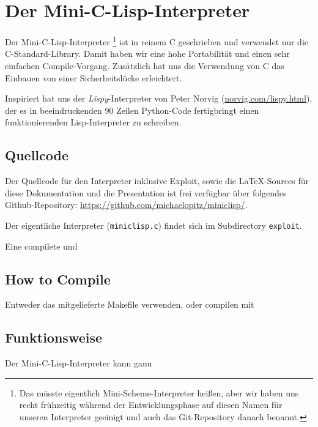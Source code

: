 \section[Mini-C-Lisp]{Der Mini-C-Lisp-Interpreter}
Der Mini-C-Lisp-Interpreter  \footnote{Das müsste eigentlich Mini-Scheme-Interpreter heißen, aber wir
  haben uns recht frühzeitig während der Entwicklungsphase auf diesen Namen
  für unseren Interpreter geeinigt und auch das Git-Repository danach benannt.
} ist in reinem C geschrieben und verwendet nur die
C-Standard-Library. Damit haben wir eine hohe Portabilität und einen sehr
einfachen Compile-Vorgang. Zusätzlich hat uns die Verwendung von C das Einbauen
von einer Sicherheitslücke erleichtert.
\par
Inspiriert hat uns der \emph{Lispy}-Interpreter von Peter Norvig
(\url{norvig.com/lispy.html}), der es in beeindruckenden 90 Zeilen Python-Code
fertigbringt einen funktionierenden Lisp-Interpreter zu schreiben.

\subsection[Quellcode]{Quellcode}
Der Quellcode für den Interpreter inklusive Exploit, sowie die \LaTeX-Sources
für diese Dokumentation und die Presentation ist frei verfügbar 
über folgendes Github-Repository: 
\url{https://github.com/michaelopitz/miniclisp/}.
\par
Der eigentliche Interpreter (\texttt{miniclisp.c}) findet sich im Subdirectory
\texttt{exploit}.
\par
Eine compilete und


\subsection[Compiling]{How to Compile}
Entweder das mitgelieferte Makefile verwenden, oder compilen mit


\subsection[Funktionsweise]{Funktionsweise}
Der Mini-C-Lisp-Interpreter kann ganu


